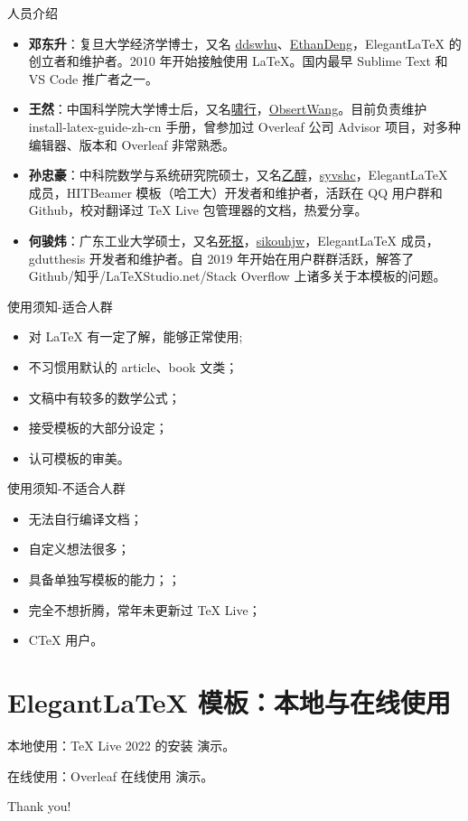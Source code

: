 \documentclass[8pt]{beamer}
\begin{document}
\begin{frame}{人员介绍}
  \begin{itemize}
    \item \textcolor{iron}{\bfseries 邓东升}：复旦大学经济学博士，又名 \underline{ddswhu}、\underline{EthanDeng}，Elegant\LaTeX{} 的创立者和维护者。2010 年开始接触使用 \LaTeX{}。国内最早 Sublime Text 和 VS Code 推广者之一。\\[2ex]
    \item \textcolor{iron}{\bfseries 王然}：中国科学院大学博士后，又名\underline{啸行}，\underline{ObsertWang}。目前负责维护 install-latex-guide-zh-cn 手册，曾参加过 Overleaf 公司 Advisor 项目，对多种编辑器、版本和 Overleaf 非常熟悉。
    \item \textcolor{iron}{\bfseries 孙忠豪}：中科院数学与系统研究院硕士，又名\underline{乙醇}，\underline{syvshc}，Elegant\LaTeX{} 成员，HITBeamer 模板（哈工大）开发者和维护者，活跃在 QQ 用户群和 Github，校对翻译过 \TeX{} Live 包管理器的文档，热爱分享。\\[2ex]
    \item \textcolor{iron}{\bfseries 何骏炜}：广东工业大学硕士，又名\underline{死抠}，\underline{sikouhjw}，Elegant\LaTeX{} 成员，gdutthesis 开发者和维护者。自 2019 年开始在用户群群活跃，解答了 Github/知乎/LaTeXStudio.net/Stack Overflow 上诸多关于本模板的问题。\\[2ex]
  \end{itemize}
\end{frame}


\begin{frame}{使用须知-适合人群}
  \begin{itemize}
    \item 对 \LaTeX{} 有一定了解，能够正常使用;
    \item 不习惯用默认的 article、book 文类；
    \item 文稿中有较多的数学公式；
    \item 接受模板的大部分设定；
    \item 认可模板的审美。
  \end{itemize}  
\end{frame}


\begin{frame}{使用须知-不适合人群}
  \begin{itemize}
    \item 无法自行编译文档；
    \item 自定义想法很多；
    \item 具备单独写模板的能力；；
    \item 完全不想折腾，常年未更新过 TeX Live；
    \item CTeX 用户。
  \end{itemize}  
\end{frame}

\section{Elegant\LaTeX{} 模板：本地与在线使用}

\begin{frame}{本地使用：\TeX{} Live 2022 的安装}
  演示。
\end{frame}

\begin{frame}{在线使用：Overleaf 在线使用}
  演示。
\end{frame}




\begin{frame}[standout]
  Thank you!
\end{frame}
\end{document}
